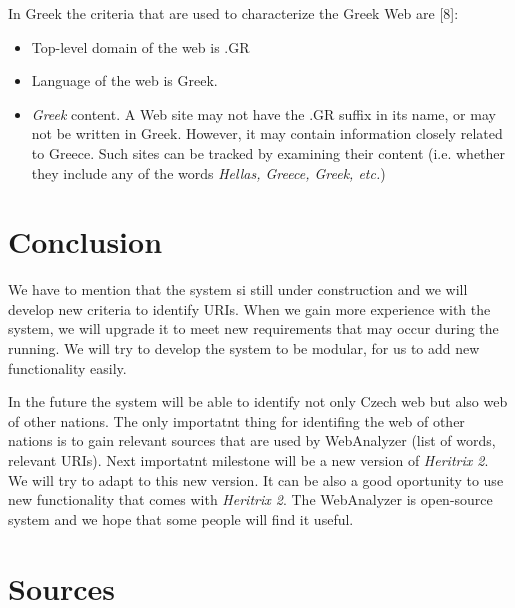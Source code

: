 \documentclass[11pt,a4paper]{article}
\begin{document}
In Greek the criteria that are used to characterize the Greek Web are [8]:
\begin{itemize}
\item Top-level domain of the web is .GR
\item Language of the web is Greek.
\item \emph{Greek} content. A Web site may not have the .GR suffix in its name, or may not be written in Greek. However, it may contain information closely related to Greece. Such sites can be tracked by examining their content (i.e. whether they include any of the words \emph{Hellas, Greece, Greek, etc.})
\end{itemize}


\section{Conclusion}

We have to mention that the system si still under construction and we will develop new criteria to identify URIs. When we gain more experience with the system, we will upgrade it to meet new requirements that may occur during the running. We will try to develop the system to be modular, for us to add new functionality easily. 

In the future the system will be able to identify not only Czech web but also web of other nations. The only importatnt thing for identifing the web of other nations is to gain relevant sources that are used by WebAnalyzer (list of words, relevant URIs). Next importatnt milestone will be a new version of \emph{Heritrix 2}. We will try to adapt to this new version. It can be also a good oportunity to use new functionality that comes with \emph{Heritrix 2}. The WebAnalyzer is open-source system and we hope that some people will find it useful.


\newpage
\section*{Sources}
\end{document}
